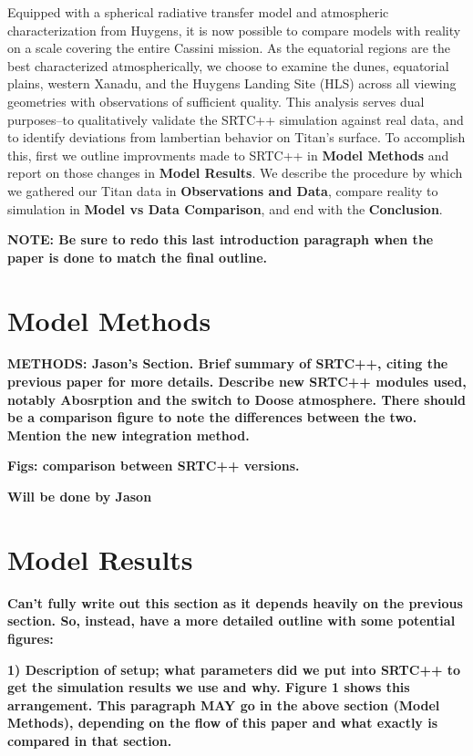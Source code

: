 \documentclass[twocolumn,linenumbers]{aastex631}
\begin{document}
Equipped with a spherical radiative transfer model and atmospheric characterization from Huygens, it is now possible to compare models with reality on a scale covering the entire Cassini mission. As the equatorial regions are the best characterized atmospherically, we choose to examine the dunes, equatorial plains, western Xanadu, and the Huygens Landing Site (HLS) across all viewing geometries with observations of sufficient quality. This analysis serves dual purposes--to qualitatively validate the SRTC++ simulation against real data, and to identify deviations from lambertian behavior on Titan's surface. To accomplish this, first we outline improvments made to SRTC++ in \textbf{Model Methods} and report on those changes in \textbf{Model Results}. We describe the procedure by which we gathered our Titan data in \textbf{Observations and Data}, compare reality to simulation in \textbf{Model vs Data Comparison}, and end with the \textbf{Conclusion}.

\textbf{\color{red}NOTE: Be sure to redo this last introduction paragraph when the paper is done to match the final outline.\color{black}}

\section{Model Methods} \label{sec:model}

\textbf{\color{blue}METHODS: Jason's Section. Brief summary of SRTC++, citing the previous paper for more details. Describe new SRTC++ modules used, notably Abosrption and the switch to Doose atmosphere. There should be a comparison figure to note the differences between the two. Mention the new integration method.\color{black}}

\textbf{\color{blue}Figs: comparison between SRTC++ versions.\color{black}}

\textbf{\color{blue}Will be done by Jason \color{black}}

\section{Model Results} \label{sec:mresults}

\textbf{\color{blue}Can't fully write out this section as it depends heavily on the previous section. So, instead, have a more detailed outline with some potential figures: \color{black}}

\textbf{\color{blue}1) Description of setup; what parameters did we put into SRTC++ to get the simulation results we use and why. Figure 1 shows this arrangement. This paragraph MAY go in the above section (Model Methods), depending on the flow of this paper and what exactly is compared in that section. \color{black}}
\end{document}
